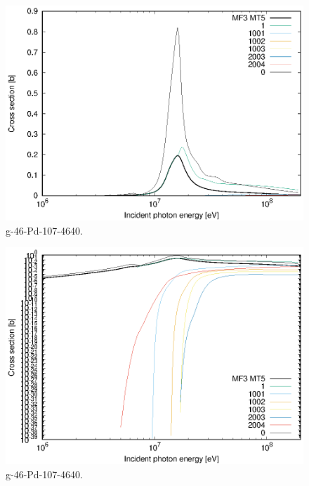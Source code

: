 \begin{figure}
 \includegraphics[width=\linewidth]{eps/g_46-Pd-107_4640.eps}
  \caption{g-46-Pd-107-4640.}
\end{figure}
\begin{figure}
 \includegraphics[width=\linewidth]{eps-log/g_46-Pd-107_4640.eps}
 \caption{g-46-Pd-107-4640.}
\end{figure}
\newpage \clearpage

